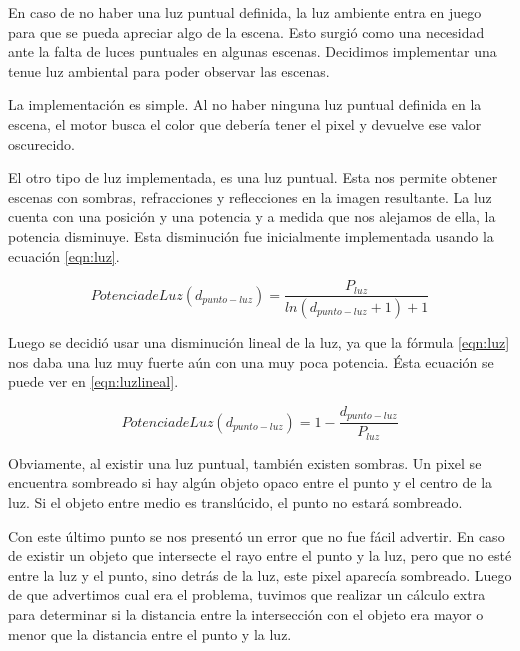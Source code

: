 \documentclass[a4paper,10pt]{article}
\begin{document}
En caso de no haber una luz puntual definida, la luz ambiente entra en juego
para que se pueda apreciar algo de la escena.  Esto surgi\'o como una necesidad
ante la falta de luces puntuales en algunas escenas.  Decidimos implementar una
tenue luz ambiental para poder observar las escenas.

La implementaci\'on es simple.  Al no haber ninguna luz puntual definida en la
escena, el motor busca el color que deber\'ia tener el pixel y devuelve ese
valor oscurecido.

El otro tipo de luz implementada, es una luz puntual.  Esta nos permite obtener
escenas con sombras, refracciones y reflecciones en la imagen resultante.  La
luz cuenta con una posici\'on y una potencia y a medida que nos alejamos de
ella, la potencia disminuye.  Esta disminuci\'on fue inicialmente implementada
usando la ecuaci\'on \ref{eqn:luz}.

\begin{equation}
\label{eqn:luz}
Potencia de Luz (d_{punto-luz}) = \frac{P_{luz}}{ln( d_{punto-luz} + 1 ) + 1}
\end{equation}

Luego se decidi\'o usar una disminuci\'on lineal de la luz, ya que la f\'ormula
\ref{eqn:luz} nos daba una luz muy fuerte a\'un con una muy poca potencia.
\'Esta ecuaci\'on
se puede ver en \ref{eqn:luzlineal}.

\begin{equation}
\label{eqn:luzlineal}
Potencia de Luz (d_{punto-luz}) = 1 - \frac{d_{punto-luz}}{P_{luz}}
\end{equation}


Obviamente, al existir una luz puntual, tambi\'en existen sombras.  Un pixel se
encuentra sombreado si hay alg\'un objeto opaco entre el punto y el centro de
la luz.  Si el objeto entre medio es transl\'ucido, el punto no estar\'a
sombreado.

Con este \'ultimo punto se nos present\'o un error que no fue f\'acil advertir.
 En caso de existir un objeto que intersecte el rayo entre el punto y la luz,
pero que no est\'e entre la luz y el punto, sino detr\'as de la luz, este pixel
aparec\'ia sombreado.  Luego de que advertimos cual era el problema, tuvimos
que realizar un c\'alculo extra para determinar si la distancia entre la
intersecci\'on con el objeto era mayor o menor que la distancia entre el punto
y la luz.
\end{document}
